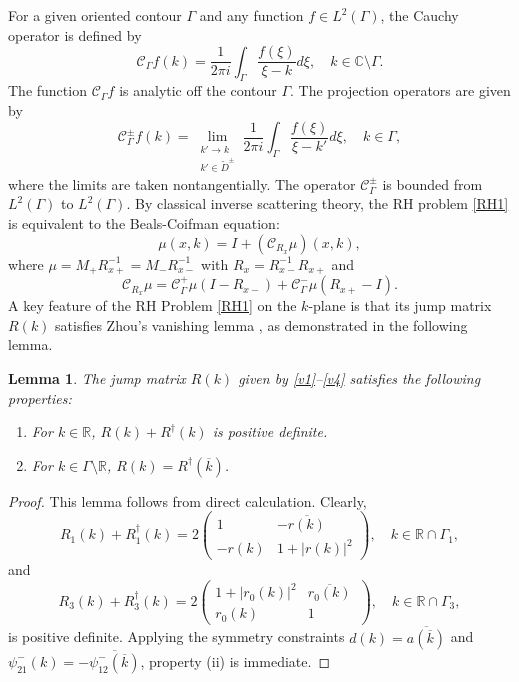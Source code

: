 \documentclass[preprint,compress,12pt]{elsarticle}
\newtheorem{lemma}[theorem]{Lemma}
\numberwithin{equation}{section}
\begin{document}
For a given oriented contour $\Gamma$ and any function $f\in L^{2}(\Gamma)$, the Cauchy operator is defined by \cite{Zhou1989b,Trogdon}
\begin{equation}
\mathcal{C}_{\Gamma}f(k)=\frac{1}{2\pi i}\int_{\Gamma}\frac{f(\xi)}{\xi-k}d\xi, \quad k\in\mathbb{C}\setminus\Gamma.
\end{equation}
The function $\mathcal{C}_{\Gamma}f$ is analytic off the contour $\Gamma$. The projection operators are given by
\begin{equation}
\mathcal{C}_{\Gamma}^{\pm}f(k)=\lim_{\substack{k'\to k \\ k'\in \widetilde{D}^{\pm}}}\frac{1}{2\pi i}\int_{\Gamma}\frac{f(\xi)}{\xi-k'}d\xi, \quad k\in \Gamma,
\end{equation}
where the limits are taken nontangentially. The operator $\mathcal{C}_{\Gamma}^{\pm}$ is bounded from $L^{2}(\Gamma)$ to $L^{2}(\Gamma)$. By classical inverse scattering theory, the RH problem \ref{RH1} is equivalent to the Beals-Coifman equation:
\begin{equation}
\mu(x,k)=I+\left(\mathcal{C}_{R_{x}}\mu\right)(x,k),
\end{equation}
where $\mu=M_{+}R_{x+}^{-1}=M_{-}R_{x-}^{-1}$ with $R_{x}=R_{x-}^{-1}R_{x+}$ and
\begin{equation}\label{opv}
\mathcal{C}_{R_{x}}\mu=\mathcal{C}_{\Gamma}^{+}\mu(I-R_{x-})+\mathcal{C}_{\Gamma}^{-}\mu(R_{x+}-I).
\end{equation}
A key feature of the RH Problem \ref{RH1} on the $k$-plane is that its jump matrix $R(k)$ satisfies Zhou's vanishing lemma \cite{Zhou1989b}, as demonstrated in the following lemma.
\begin{lemma}\label{vanish}
The jump matrix $R(k)$ given by \eqref{v1}--\eqref{v4} satisfies the following properties:
\begin{enumerate}[label=(\roman*)]
  \item For $k\in\mathbb{R}$, $R(k)+R^{\dag}(k)$ is positive definite.
  \item For $k \in \Gamma \setminus \mathbb{R}$, $R(k)=R^{\dag}(\overline{k})$.
\end{enumerate}
\end{lemma}
\begin{proof}
This lemma follows from direct calculation. Clearly,
\begin{equation*}
R_{1}(k)+R_{1}^{\dag}(k)=2\begin{pmatrix}1&-\overline{r(k)}\\-r(k)&1+|r(k)|^{2}\end{pmatrix},\quad k\in\mathbb{R}\cap\Gamma_{1},
\end{equation*}
and
\begin{equation*}
R_{3}(k)+R_{3}^{\dag}(k)=2\begin{pmatrix}1+|r_{0}(k)|^{2}&\overline{r_{0}(k)}\, \\r_{0}(k)&1\end{pmatrix},\quad k\in\mathbb{R}\cap\Gamma_{3},
\end{equation*}
is positive definite. Applying the symmetry constraints $d(k)=\overline{a(\overline{k})}$ and $\psi_{21}^{-}(k)=-\overline{\psi_{12}^{-}(\overline{k})}$, property (ii) is immediate.
\end{proof}
\end{document}
